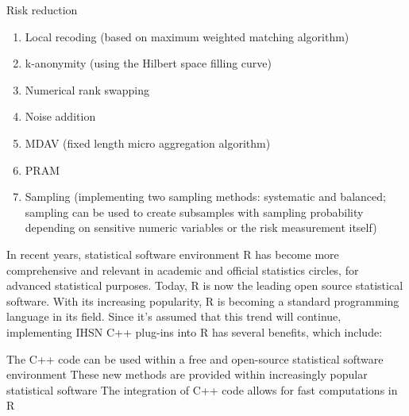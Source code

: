 \documentclass[SDCmaster.tex]{subfiles}
\begin{document}
\begin{frame}
Risk reduction
\begin{enumerate}
\item Local recoding (based on maximum weighted matching algorithm)
\item  k-anonymity (using the Hilbert space filling curve)
\item  Numerical rank swapping
\item  Noise addition
\item  MDAV (fixed length micro aggregation algorithm)
\item  PRAM
\item  Sampling (implementing two sampling methods: systematic and balanced; sampling can be used to create subsamples with sampling probability depending on sensitive numeric variables or the risk measurement itself)
\end{enumerate}
\end{frame}

\begin{frame}

In recent years, statistical software environment R has become more comprehensive and relevant in academic and official statistics circles, for advanced statistical purposes. Today, R is now the leading open source statistical software. With its increasing popularity, R is becoming a standard programming language in its field. Since it’s assumed that this trend will continue, implementing IHSN C++ plug-ins into R has several benefits, which include:
\end{frame}

\begin{frame}
The C++ code can be used within a free and open-source statistical software environment
These new methods are provided within increasingly popular statistical software
The integration of C++ code allows for fast computations in R
\end{frame}
\end{document}
